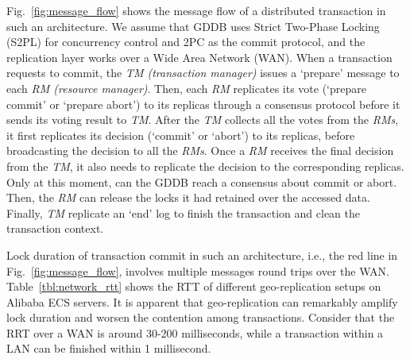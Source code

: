 \documentclass[conference]{IEEEtran}
\begin{document}
Fig.~\ref{fig:message_flow} shows the message flow of a distributed transaction in such an architecture. We assume that
GDDB uses Strict Two-Phase Locking (S2PL) for concurrency control and 2PC as the commit protocol, and the replication layer works over a Wide Area Network (WAN).
When a transaction requests to commit, the \emph{TM (transaction manager)} issues a `prepare' message to each \emph{RM (resource manager)}.
Then, each \emph{RM} replicates its vote (`prepare commit' or `prepare abort') to its replicas through a consensus protocol before it
sends its voting result to \emph{TM}.
After the \emph{TM} collects all the votes from the \emph{RMs}, it first replicates its decision (`commit' or `abort') to its replicas, before broadcasting the decision to all the \emph{RMs}.
Once a \emph{RM} receives the final decision from the \emph{TM}, it also needs to replicate the decision to the corresponding replicas.
Only at this moment, can the GDDB reach a consensus about commit or abort.
Then, the \emph{RM} can release the locks it had retained over the accessed data.
Finally, \emph{TM} replicate an `end' log to finish the transaction and clean the transaction context.


\begin{table}[tbp]
  \centering
  \caption{network message RTT on Alibaba ECS}

\label{tbl:network_rtt}
\end{table}

Lock duration of transaction commit in such an architecture, i.e., the red line in Fig.~\ref{fig:message_flow}, involves multiple messages round trips over the WAN.
Table~\ref{tbl:network_rtt} shows the RTT of different geo-replication setups on Alibaba ECS servers.
It is apparent that geo-replication can remarkably amplify lock duration and worsen the contention among transactions.
Consider that the RRT over a WAN is around 30-200 milliseconds, while a transaction within a LAN can be finished within 1 millisecond.
\end{document}
